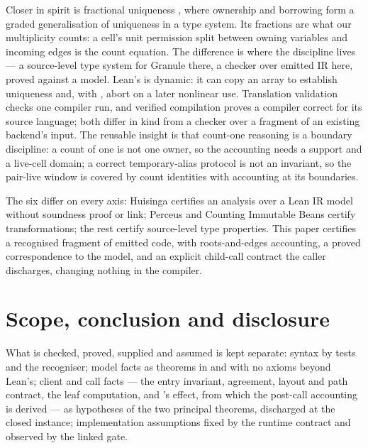 \documentclass[a4paper,UKenglish,cleveref]{lipics-v2021}
\begin{document}
Closer in spirit is fractional uniqueness \cite{marshall2024fractional}, where
ownership and borrowing form a graded generalisation of uniqueness in a type
system. Its fractions are what our multiplicity counts: a cell's unit permission
split between owning variables and incoming edges is the count equation. The
difference is where the discipline lives --- a source-level type system for Granule
there, a checker over emitted IR here, proved against a model. Lean's  \cite{marklinear} is dynamic: it can copy an
array to establish uniqueness and, with , abort
on a later nonlinear use. Translation validation \cite{translationvalidation}
checks one compiler run, and verified compilation \cite{compcert,cakeml} proves a
compiler correct for its source language; both differ in kind from a checker over
a fragment of an existing backend's input. The reusable insight is that count-one
reasoning is a boundary discipline: a count of one is not one owner, so the
accounting needs a support and a live-cell domain; a correct temporary-alias
protocol is not an invariant, so the pair-live window is covered by count
identities with accounting at its boundaries.

The six differ on every axis: Huisinga certifies an analysis over a Lean IR model
without soundness proof or link; Perceus and Counting Immutable Beans certify
transformations; the rest certify source-level type properties.
This paper certifies a recognised fragment of emitted code, with roots-and-edges
accounting, a proved correspondence to the model, and an explicit child-call
contract the caller discharges, changing nothing in the compiler.

\section{Scope, conclusion and disclosure}\label{sec:limits}

What is checked, proved, supplied and assumed is kept separate: syntax by
 tests and the recogniser; model facts as theorems in 
and  with no axioms beyond Lean's; client and call facts --- the
entry invariant, agreement, layout and path contract, the leaf computation, and
's  effect, from which the post-call accounting is
derived --- as hypotheses of the two principal theorems, discharged at the closed
instance; implementation assumptions fixed by the runtime contract and observed by
the linked gate.
\end{document}
